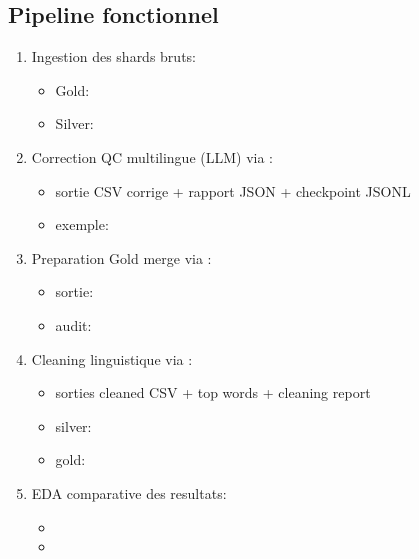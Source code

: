 \documentclass[11pt,a4paper]{article}
\begin{document}
\subsection{Pipeline fonctionnel}
\begin{enumerate}[leftmargin=*]
  \item Ingestion des shards bruts:
  \begin{itemize}[leftmargin=*]
    \item Gold: 
    \item Silver: 
  \end{itemize}
  \item Correction QC multilingue (LLM) via :
  \begin{itemize}[leftmargin=*]
    \item sortie CSV corrige + rapport JSON + checkpoint JSONL
    \item exemple: 
  \end{itemize}
  \item Preparation Gold merge via :
  \begin{itemize}[leftmargin=*]
    \item sortie: 
    \item audit: 
  \end{itemize}
  \item Cleaning linguistique via :
  \begin{itemize}[leftmargin=*]
    \item sorties cleaned CSV + top words + cleaning report
    \item silver: 
    \item gold: 
  \end{itemize}
  \item EDA comparative des resultats:
  \begin{itemize}[leftmargin=*]
    \item {}
    \item {}
  \end{itemize}
\end{enumerate}
\end{document}
